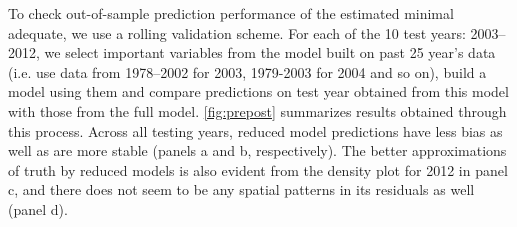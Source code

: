 To check out-of-sample prediction performance of the estimated minimal adequate, we use a rolling validation scheme. For each of the 10 test years: 2003--2012, we select important variables from the model built on past 25 year's data (i.e. use data from 1978--2002 for 2003, 1979-2003 for 2004 and so on), build a model using them and compare predictions on test year obtained from this model with those from the full model. \ref{fig:prepost} summarizes results obtained through this process. Across all testing years, reduced model predictions have less bias as well as are more stable (panels a and b, respectively). The better approximations of truth by reduced models is also evident from the density plot for 2012 in panel c, and there does not seem to be any spatial patterns in its residuals as well (panel d).
%

